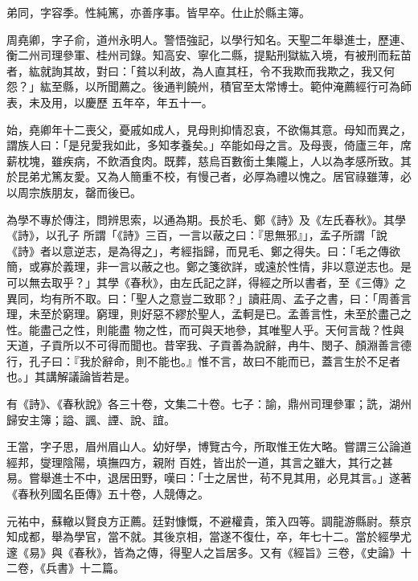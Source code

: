 \begin{pinyinscope}
 弟同，字容季。性純篤，亦善序事。皆早卒。仕止於縣主簿。



 周堯卿，字子俞，道州永明人。警悟強記，以學行知名。天聖二年舉進士，歷連、衡二州司理參軍、桂州司錄。知高安、寧化二縣，提點刑獄紘入境，有被刑而耘苗者，紘就詢其故，對曰：「貧以利故，為人直其枉，令不我欺而我欺之，我又何怨？」紘至縣，以所聞薦之。後通判饒州，積官至太常博士。範仲淹薦經行可為師表，未及用，以慶歷
 五年卒，年五十一。



 始，堯卿年十二喪父，憂戚如成人，見母則抑情忍哀，不欲傷其意。母知而異之，謂族人曰：「是兒愛我如此，多知孝養矣。」卒能如母之言。及母喪，倚廬三年，席薪枕塊，雖疾病，不飲酒食肉。既葬，慈烏百數銜土集隴上，人以為孝感所致。其於昆弟尤篤友愛。又為人簡重不校，有慢己者，必厚為禮以愧之。居官祿雖薄，必以周宗族朋友，罄而後已。



 為學不專於傳注，問辨思索，以通為期。長於毛、鄭《詩》及《左氏春秋》。其學《詩》，以孔子
 所謂「《詩》三百，一言以蔽之曰：『思無邪』」，孟子所謂「說《詩》者以意逆志，是為得之」，考經指歸，而見毛、鄭之得失。曰：「毛之傳欲簡，或寡於義理，非一言以蔽之也。鄭之箋欲詳，或遠於性情，非以意逆志也。是可以無去取乎？」其學《春秋》，由左氏記之詳，得經之所以書者，至《三傳》之異同，均有所不取。曰：「聖人之意豈二致耶？」讀莊周、孟子之書，曰：「周善言理，未至於窮理。窮理，則好惡不繆於聖人，孟軻是已。孟善言性，未至於盡己之性。能盡己之性，則能盡
 物之性，而可與天地參，其唯聖人乎。天何言哉？性與天道，子貢所以不可得而聞也。昔宰我、子貢善為說辭，冉牛、閔子、顏淵善言德行，孔子曰：『我於辭命，則不能也。』惟不言，故曰不能而已，蓋言生於不足者也。」其講解議論皆若是。



 有《詩》、《春秋說》各三十卷，文集二十卷。七子：諭，鼎州司理參軍；詵，湖州歸安主簿；謚、諷、諲、說、誼。



 王當，字子思，眉州眉山人。幼好學，博覽古今，所取惟王佐大略。嘗謂三公論道經邦，燮理陰陽，填撫四方，親附
 百姓，皆出於一道，其言之雖大，其行之甚易。嘗舉進士不中，退居田野，嘆曰：「士之居世，茍不見其用，必見其言。」遂著《春秋列國名臣傳》五十卷，人競傳之。



 元祐中，蘇轍以賢良方正薦。廷對慷慨，不避權貴，策入四等。調龍游縣尉。蔡京知成都，舉為學官，當不就。其後京相，當遂不復仕，卒，年七十二。當於經學尤邃《易》與《春秋》，皆為之傳，得聖人之旨居多。又有《經旨》三卷，《史論》十二卷，《兵書》十二篇。




\end{pinyinscope}
